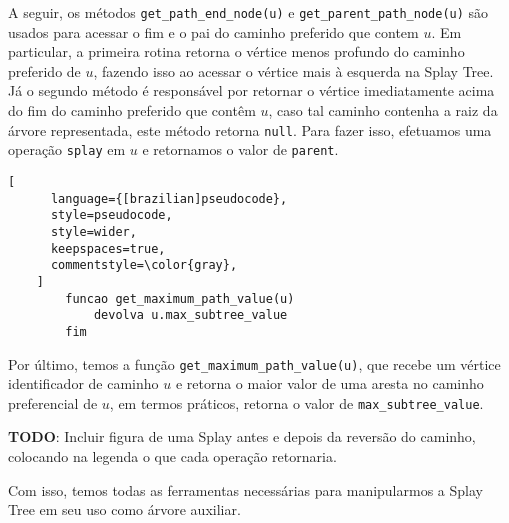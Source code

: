 A seguir, os métodos \texttt{get\_path\_end\_node(u)} e \texttt{get\_parent\_path\_node(u)} são usados para acessar o fim e o pai do caminho preferido que contem $u$. Em particular, a primeira rotina retorna o vértice menos profundo do caminho preferido de $u$, fazendo isso ao acessar o vértice mais à esquerda na Splay Tree. Já o segundo método é responsável por retornar o vértice imediatamente acima do fim do caminho preferido que contêm $u$, caso tal caminho contenha a raiz da árvore representada, este método retorna \texttt{null}. Para fazer isso, efetuamos uma operação \texttt{splay} em $u$ e retornamos o valor de \texttt{parent}.

\begin{programruledcaption}{\label{splay:get-maximum-value}}
    \begin{lstlisting}[
      language={[brazilian]pseudocode},
      style=pseudocode,
      style=wider,
      keepspaces=true,
      commentstyle=\color{gray},
    ]
        funcao get_maximum_path_value(u)
            devolva u.max_subtree_value
        fim
    \end{lstlisting}
\end{programruledcaption}

Por último, temos a função \texttt{get\_maximum\_path\_value(u)}, que recebe um vértice identificador de caminho $u$ e retorna o maior valor de uma aresta no caminho preferencial de $u$, em termos práticos, retorna o valor de \texttt{max\_subtree\_value}.

\begin{center}
    \textbf{TODO}: Incluir figura de uma Splay antes e depois da reversão do caminho, colocando na legenda o que cada operação retornaria.
\end{center}

Com isso, temos todas as ferramentas necessárias para manipularmos a Splay Tree em seu uso como árvore auxiliar.